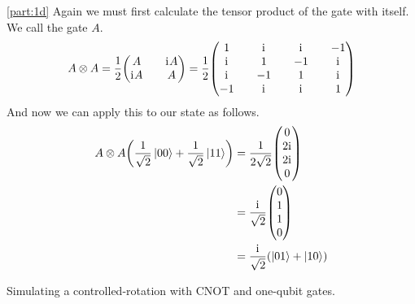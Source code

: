 \documentclass[boxes,pages]{homework}
\newcommand{\iu}{\mathrm{i}\mkern1mu}
\begin{document}
\begin{solution}
	\ref{part:1d}
	Again we must first calculate the tensor product of the gate with itself. We call the gate $A$.
	\begin{equation*}
		A\otimes A = \frac{1}{2}\mqty(A && \iu A \\ \iu A && A) = \frac{1}{2}\mqty(1 && \iu && \iu && -1 \\ \iu && 1 && -1 && \iu \\ \iu && -1 && 1 && \iu \\ -1 && \iu && \iu && 1)
	\end{equation*}
	And now we can apply this to our state as follows.
	\begin{align*}
		A\otimes A \qty(\frac{1}{\sqrt{2}}\ket{00} + \frac{1}{\sqrt{2}}\ket{11}) & = \frac{1}{2\sqrt{2}}\mqty(0                    \\ 2\iu \\ 2\iu \\ 0) \\
		                                                                         & = \frac{\iu}{\sqrt{2}}\mqty(0                   \\ 1 \\ 1 \\ 0) \\
		                                                                         & = \frac{\iu}{\sqrt{2}}\qty(\ket{01} + \ket{10})
	\end{align*}
\end{solution}

\begin{problem}
Simulating a controlled-rotation with CNOT and one-qubit gates.
\end{problem}
\end{document}
